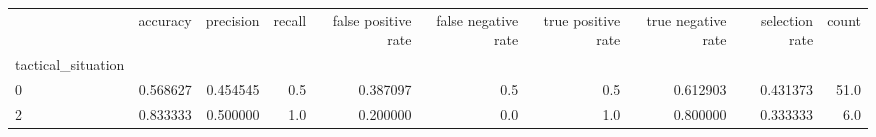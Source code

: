 \begin{tabular}{lrrrrrrrrr}
\toprule
{} &  accuracy &  precision &  recall &  false positive rate &  false negative rate &  true positive rate &  true negative rate &  selection rate &  count \\
tactical\_situation &           &            &         &                      &                      &                     &                     &                 &        \\
\midrule
0                  &  0.568627 &   0.454545 &     0.5 &             0.387097 &                  0.5 &                 0.5 &            0.612903 &        0.431373 &   51.0 \\
2                  &  0.833333 &   0.500000 &     1.0 &             0.200000 &                  0.0 &                 1.0 &            0.800000 &        0.333333 &    6.0 \\
\bottomrule
\end{tabular}

